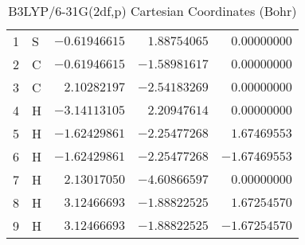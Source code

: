 \documentclass[10pt,oneside]{article}
\begin{document}
\begin{table}[h]
\centering
\caption{B3LYP/6-31G(2df,p) Cartesian Coordinates (Bohr)}
\begin{tabular}{llrrr}
\toprule
1  & S  & $-0.61946615$ & $ 1.88754065$ & $ 0.00000000$ \\
2  & C  & $-0.61946615$ & $-1.58981617$ & $ 0.00000000$ \\
3  & C  & $ 2.10282197$ & $-2.54183269$ & $ 0.00000000$ \\
4  & H  & $-3.14113105$ & $ 2.20947614$ & $ 0.00000000$ \\
5  & H  & $-1.62429861$ & $-2.25477268$ & $ 1.67469553$ \\
6  & H  & $-1.62429861$ & $-2.25477268$ & $-1.67469553$ \\
7  & H  & $ 2.13017050$ & $-4.60866597$ & $ 0.00000000$ \\
8  & H  & $ 3.12466693$ & $-1.88822525$ & $ 1.67254570$ \\
9  & H  & $ 3.12466693$ & $-1.88822525$ & $-1.67254570$ \\
\bottomrule
\end{tabular}
\end{table}
\end{document}
